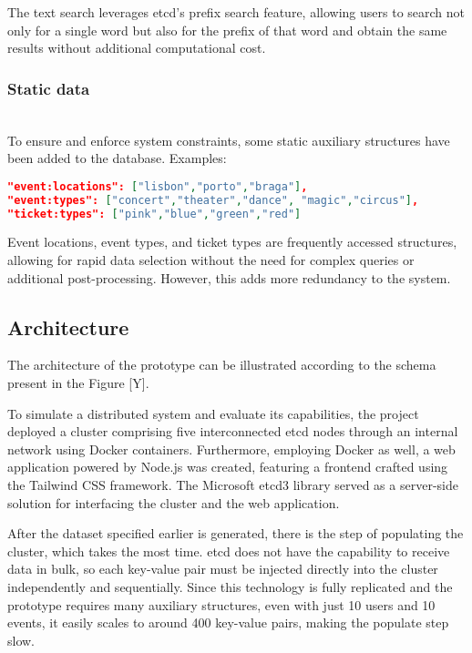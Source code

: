 \documentclass[screen,review]{acmart}
\begin{document}
The text search leverages etcd's prefix search feature, allowing users to search not only for a single word but also for the prefix of that word and obtain the same results without additional computational cost.\\

\subsubsection{Static data}~\\
To ensure and enforce system constraints, some static auxiliary structures have been added to the database. Examples:

\begin{lstlisting}[language=json]
"event:locations": ["lisbon","porto","braga"],
"event:types": ["concert","theater","dance", "magic","circus"],
"ticket:types": ["pink","blue","green","red"]
\end{lstlisting}

Event locations, event types, and ticket types are frequently accessed structures, allowing for rapid data selection without the need for complex queries or additional post-processing. However, this adds more redundancy to the system.

\subsection{Architecture}

The architecture of the prototype can be illustrated according to the schema present in the Figure [Y].

To simulate a distributed system and evaluate its capabilities, the project deployed a cluster comprising five interconnected etcd nodes through an internal network using Docker containers. Furthermore, employing Docker as well, a web application powered by Node.js was created, featuring a frontend crafted using the Tailwind CSS framework. The Microsoft etcd3 library served as a server-side solution for interfacing the cluster and the web application.

After the dataset specified earlier is generated, there is the step of populating the cluster, which takes the most time. etcd does not have the capability to receive data in bulk, so each key-value pair must be injected directly into the cluster independently and sequentially. Since this technology is fully replicated and the prototype requires many auxiliary structures, even with just 10 users and 10 events, it easily scales to around 400 key-value pairs, making the populate step slow.
\end{document}
